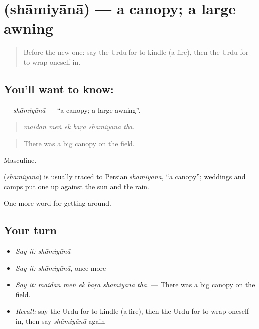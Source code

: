 \section[\texorpdfstring{\ur{شامیانہ} (shāmiyānā)}{شامیانہ (shāmiyānā)}]{ (shāmiyānā) — a canopy; a large awning}

\label{lesson:UR-C406-shamiyana}



\begin{quote}
Before the new one: say the Urdu for to kindle (a fire), then the Urdu for to wrap oneself in.
\end{quote}

\subsection*{You'll want to know: }
\textbf{} — \emph{shāmiyānā} — \textquotedblleft{}a canopy; a large awning\textquotedblright{}.

\begin{quote}
     
\end{quote}

\begin{quote}
\emph{maidān meṅ ek baṛā shāmiyānā thā.}
\end{quote}

\begin{quote}
There was a big canopy on the field.
\end{quote}

Masculine.

\begin{cousinweb}
\textbf{} (\emph{shāmiyānā}) is usually traced to Persian \emph{shāmiyāna}, \textquotedblleft{}a canopy\textquotedblright{}; weddings and camps put one up against the sun and the rain.
\end{cousinweb}

\begin{grammarlens}[title={What you've built}]
One more word for getting around.
\end{grammarlens}

\subsection*{Your turn}
\begin{itemize}
\raggedright
  \item \emph{Say it:} \emph{shāmiyānā}
  \item \emph{Say it:} \emph{shāmiyānā}, once more
  \item \emph{Say it:} \emph{maidān meṅ ek baṛā shāmiyānā thā.} — There was a big canopy on the field.
  \item \emph{Recall:} say the Urdu for to kindle (a fire), then the Urdu for to wrap oneself in, then say \emph{shāmiyānā} again
\end{itemize}

